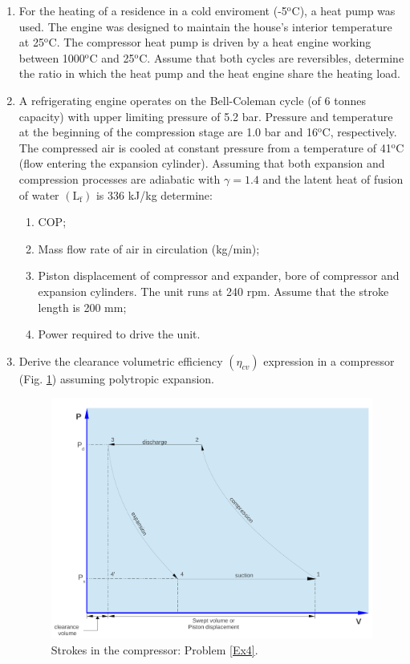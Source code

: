 \documentclass[12pts,a4paper,amsmath,amssymb,floatfix]{article}%
\begin{document}
\begin{enumerate}[label=\bfseries Problem \arabic*]

\item For the heating of a residence in a cold enviroment (-5$^{\text{o}}$C), a heat pump was used. The engine was designed to maintain the house's interior temperature at 25$^{\text{o}}$C. The compressor heat pump is driven by a heat engine working between 1000$^{\text{o}}$C and 25$^{\text{o}}$C. Assume that both cycles are reversibles, determine the ratio in which the heat pump and the heat engine share the heating load.

\item A refrigerating engine operates on the Bell-Coleman cycle (of 6 tonnes capacity) with upper limiting pressure of 5.2 bar. Pressure and temperature at the beginning of the compression stage are 1.0 bar and 16$^{\text{o}}$C, respectively. The compressed air is cooled at constant pressure from a temperature of 41$^{\text{o}}$C  (flow entering the expansion cylinder). Assuming that both expansion and compression processes are adiabatic with $\gamma=1.4$ and the latent heat of fusion of water $\left(\text{L}_{\text{f}}\right)$ is 336 kJ/kg determine:

\begin{enumerate}
\item COP;
\item Mass flow rate of air in circulation (kg/min);
\item Piston displacement of compressor and expander, bore of compressor and expansion cylinders. The unit runs at 240 rpm. Assume that the stroke length is 200 mm;
\item Power required to drive the unit.
\end{enumerate}

\item \label{Ex4} Derive the clearance volumetric efficiency $\left(\eta_{cv}\right)$ expression in a compressor (Fig. \ref{ex4_pic}) assuming polytropic expansion.
\begin{figure}[h]
 \begin{center}
  \includegraphics[width=12.cm,height=8.cm,clip]{./Pics/Overview_Refrig29}
  \end{center}
  \caption{Strokes in the compressor: Problem \ref{Ex4}.}\label{ex4_pic}
\end{figure}  



\end{enumerate}
\end{document}
